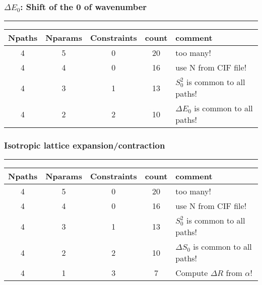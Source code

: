 \documentclass[10pt, xcolor=x11names, compress]{beamer}
\begin{document}
\begin{frame}
  \frametitle{$\Delta E_0$: Shift of the 0 of wavenumber}
  \exafsequation

  \smallskip

  \par\noindent\rule{\textwidth}{0.4pt}
  
  \begin{overlayarea}{\linewidth}{0.5\textheight} 
    \begin{center}
      \begin{tabular}{ccccl}
        Npaths & Nparams & Constraints & count & comment \\
        \hline
        {\color{Gray0}4} & {\color{Gray0}5} & {\color{Gray0}0} & {\color{Gray0}20} & {\color{Gray0}too many!}\\
        {\color{Gray0}4} & {\color{Gray0}4} & {\color{Gray0}0} & {\color{Gray0}16} & {\color{Gray0}use N from CIF file!}\\
        {\color{Gray0}4} & {\color{Gray0}3} & {\color{Gray0}1} & {\color{Gray0}13} & {\color{Gray0}$S_0^2$ is common to all paths!}\\
        4 & \alert{2} & \alert{2} & \alert{10} & \alert{$\Delta E_0$ is common to all paths!}\\
        \hline
      \end{tabular}
    \end{center}
  \end{overlayarea}
\end{frame}

\begin{frame}
  \frametitle{Isotropic lattice expansion/contraction}
  \exafsequation

  \smallskip

  \par\noindent\rule{\textwidth}{0.4pt}
  
  \begin{overlayarea}{\linewidth}{0.5\textheight} 
    \begin{center}
      \begin{tabular}{ccccl}
        Npaths & Nparams & Constraints & count & comment \\
        \hline
        {\color{Gray0}4} & {\color{Gray0}5} & {\color{Gray0}0} & {\color{Gray0}20} & {\color{Gray0}too many!}\\
        {\color{Gray0}4} & {\color{Gray0}4} & {\color{Gray0}0} & {\color{Gray0}16} & {\color{Gray0}use N from CIF file!}\\
        {\color{Gray0}4} & {\color{Gray0}3} & {\color{Gray0}1} & {\color{Gray0}13} & {\color{Gray0}$S_0^2$ is common to all paths!}\\
        {\color{Gray0}4} & {\color{Gray0}2} & {\color{Gray0}2} & {\color{Gray0}10} & {\color{Gray0}$\Delta S_0$ is common to all paths!}\\
        4 & \alert{1} & \alert{3} & \alert{7} & \alert{Compute $\Delta R$ from $\alpha$!}\\
        \hline
      \end{tabular}
    \end{center}
  \end{overlayarea}
\end{frame}
\end{document}
